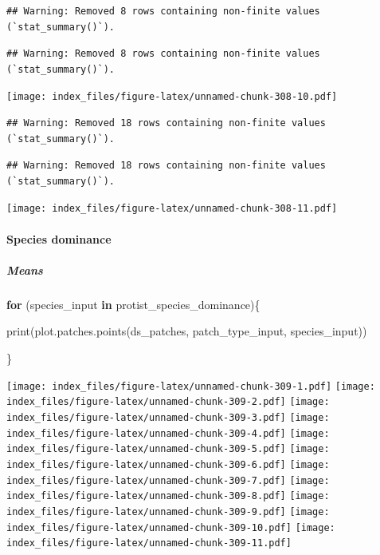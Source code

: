 \documentclass[
]{article}
\newenvironment{Shaded}{\begin{snugshade}}{\end{snugshade}}
\newcommand{\ControlFlowTok}[1]{\textcolor[rgb]{0.13,0.29,0.53}{\textbf{#1}}}
\newcommand{\FunctionTok}[1]{\textcolor[rgb]{0.00,0.00,0.00}{#1}}
\newcommand{\NormalTok}[1]{#1}
\begin{document}
\begin{verbatim}
## Warning: Removed 8 rows containing non-finite values (`stat_summary()`).
\end{verbatim}

\begin{verbatim}
## Warning: Removed 8 rows containing non-finite values (`stat_summary()`).
\end{verbatim}

\texttt{[image: index\_files/figure-latex/unnamed-chunk-308-10.pdf]}

\begin{verbatim}
## Warning: Removed 18 rows containing non-finite values (`stat_summary()`).
\end{verbatim}

\begin{verbatim}
## Warning: Removed 18 rows containing non-finite values (`stat_summary()`).
\end{verbatim}

\texttt{[image: index\_files/figure-latex/unnamed-chunk-308-11.pdf]}

\hypertarget{species-dominance-1}{%
\paragraph{Species dominance}\label{species-dominance-1}}

\hypertarget{means-21}{%
\subparagraph{Means}\label{means-21}}

\begin{Shaded}
\begin{Highlighting}[]
\ControlFlowTok{for}\NormalTok{ (species\_input }\ControlFlowTok{in}\NormalTok{ protist\_species\_dominance)\{}
  
  \FunctionTok{print}\NormalTok{(}\FunctionTok{plot.patches.points}\NormalTok{(ds\_patches, patch\_type\_input,}
\NormalTok{                            species\_input))}
  
\NormalTok{\}}
\end{Highlighting}
\end{Shaded}

\texttt{[image: index\_files/figure-latex/unnamed-chunk-309-1.pdf]}
\texttt{[image: index\_files/figure-latex/unnamed-chunk-309-2.pdf]}
\texttt{[image: index\_files/figure-latex/unnamed-chunk-309-3.pdf]}
\texttt{[image: index\_files/figure-latex/unnamed-chunk-309-4.pdf]}
\texttt{[image: index\_files/figure-latex/unnamed-chunk-309-5.pdf]}
\texttt{[image: index\_files/figure-latex/unnamed-chunk-309-6.pdf]}
\texttt{[image: index\_files/figure-latex/unnamed-chunk-309-7.pdf]}
\texttt{[image: index\_files/figure-latex/unnamed-chunk-309-8.pdf]}
\texttt{[image: index\_files/figure-latex/unnamed-chunk-309-9.pdf]}
\texttt{[image: index\_files/figure-latex/unnamed-chunk-309-10.pdf]}
\texttt{[image: index\_files/figure-latex/unnamed-chunk-309-11.pdf]}
\end{document}
